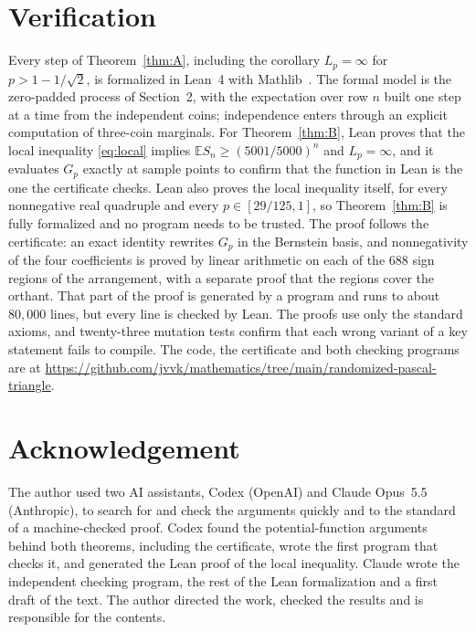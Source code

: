 \documentclass[11pt]{article}
\theoremstyle{remark}
\newcommand{\E}{\mathbb{E}}
\begin{document}
\section{Verification}

Every step of Theorem~\ref{thm:A}, including the corollary $L_p=\infty$ for $p>1-1/\sqrt2$, is formalized in Lean~4 with Mathlib~\cite{mathlib}. The formal model is the zero-padded process of Section~2, with the expectation over row $n$ built one step at a time from the independent coins; independence enters through an explicit computation of three-coin marginals. For Theorem~\ref{thm:B}, Lean proves that the local inequality \eqref{eq:local} implies $\E S_n\ge(5001/5000)^n$ and $L_p=\infty$, and it evaluates $G_p$ exactly at sample points to confirm that the function in Lean is the one the certificate checks. Lean also proves the local inequality itself, for every nonnegative real quadruple and every $p\in[29/125,1]$, so Theorem~\ref{thm:B} is fully formalized and no program needs to be trusted. The proof follows the certificate: an exact identity rewrites $G_p$ in the Bernstein basis, and nonnegativity of the four coefficients is proved by linear arithmetic on each of the $688$ sign regions of the arrangement, with a separate proof that the regions cover the orthant. That part of the proof is generated by a program and runs to about $80{,}000$ lines, but every line is checked by Lean. The proofs use only the standard axioms, and twenty-three mutation tests confirm that each wrong variant of a key statement fails to compile. The code, the certificate and both checking programs are at \url{https://github.com/jvvk/mathematics/tree/main/randomized-pascal-triangle}.

\section*{Acknowledgement}
The author used two AI assistants, Codex (OpenAI) and Claude Opus~5.5 (Anthropic), to search for and check the arguments quickly and to the standard of a machine-checked proof. Codex found the potential-function arguments behind both theorems, including the certificate, wrote the first program that checks it, and generated the Lean proof of the local inequality. Claude wrote the independent checking program, the rest of the Lean formalization and a first draft of the text. The author directed the work, checked the results and is responsible for the contents.
\end{document}
